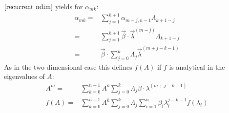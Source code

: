 \documentclass{article}
\begin{document}
$\eqref{recurrent ndim}$ yields for $\alpha_{mk}$:
\begin{align}
\alpha_{mk} =& \sum_{j=1}^{k+1} \alpha_{m-j,n-1} \Lambda_{k+1-j} \nonumber\\
=& \sum_{j=1}^{k+1} \vec\beta\cdot\vec\lambda^{(m-j)} \Lambda_{k+1-j} \nonumber\\
=& \vec\beta\cdot \sum_{j=0}^k \Lambda_j \vec\lambda^{(m+j-k-1)}
\end{align}
As in the two dimensional case this defines $f(A)$ if $f$ is analytical in the eigenvalues of $A$:
\begin{align}
A^m =& \sum_{k=0}^{n-1} A^k \sum_{j=0}^k \Lambda_j  \beta \cdot \lambda^{(m+j-k-1)}\\
f(A) =& \sum_{k=0}^{n-1} A^k \sum_{j=0}^k \Lambda_j \sum_{i=1}^n \beta_i \lambda_i^{j-k-1} f(\lambda_i)
\end{align}

\end{document}
